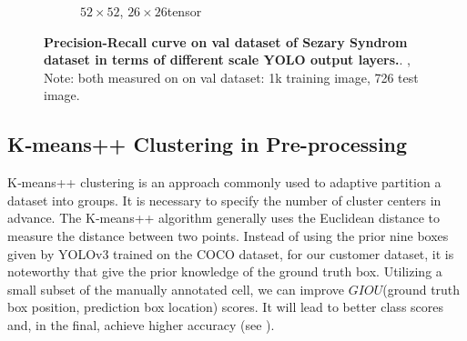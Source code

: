 \begin{figure}[h]
\begin{center}
\begin{subfigure}[b]{0.49\textwidth}
			\caption{$52 \times 52$, $26 \times 26$tensor }
			\label{fig:cellnet}
		\end{subfigure}
	\end{center}
	\caption{\textbf{Precision-Recall curve on val dataset of Sezary Syndrom dataset in terms of different scale YOLO output layers.}. ,  Note: both measured on on val dataset: 1k training image, 726 test image.}
	\label{fig:3.1}
\end{figure}


\subsection{K‐means++ Clustering in Pre-processing}

K‐means++ clustering is an approach commonly used to adaptive partition a dataset into groups. It is necessary to specify the number of cluster centers in advance. The K‐means++ algorithm generally uses the Euclidean distance to measure the distance between two points. Instead of using the prior nine boxes given by YOLOv3\cite{33} trained on the COCO dataset, for our customer dataset, it is noteworthy that give the prior knowledge of the ground truth box. Utilizing a small subset of the manually annotated cell, we can improve $GIOU$(ground truth box position, prediction box location) scores. It will lead to better class scores and, in the final, achieve higher accuracy (see \eg{}).


